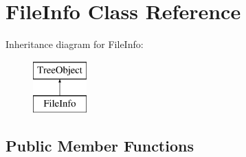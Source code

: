 \hypertarget{classFileInfo}{}\section{File\+Info Class Reference}
\label{classFileInfo}
Inheritance diagram for File\+Info\+:\begin{figure}[H]
\begin{center}
\leavevmode
\includegraphics[height=2.000000cm]{classFileInfo}
\end{center}
\end{figure}
\subsection*{Public Member Functions}
